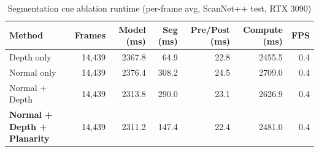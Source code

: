 \begin{table}[t]
  \centering
  \caption{Segmentation cue ablation runtime (per-frame avg, ScanNet++ test, RTX 3090)}
  \label{tab:ablation_runtime}
  \begin{tabular}{l r r r r r r}
    \toprule
    Method & Frames & Model (ms) & Seg (ms) & Pre/Post (ms) & Compute (ms) & FPS \\
    \midrule
    Depth only & 14,439 & 2367.8 & 64.9 & 22.8 & 2455.5 & 0.4 \\
    Normal only & 14,439 & 2376.4 & 308.2 & 24.5 & 2709.0 & 0.4 \\
    Normal + Depth & 14,439 & 2313.8 & 290.0 & 23.1 & 2626.9 & 0.4 \\
    \textbf{Normal + Depth + Planarity} & 14,439 & 2311.2 & 147.4 & 22.4 & 2481.0 & 0.4 \\
    \bottomrule
  \end{tabular}
\end{table}